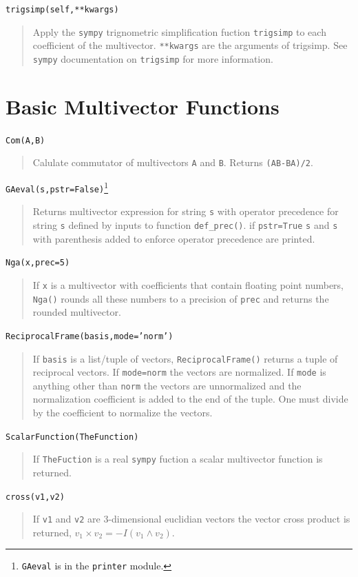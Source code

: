 \documentclass[12pt]{report}
\newcommand{\lp}{\left (}
\newcommand{\rp}{\right )}
\newcommand{\W}{\wedge}
\newcommand{\paren}[1]{\lp {#1} \rp}
\newcommand{\T}[1]{\texttt{#1}}
\begin{document}
\T{trigsimp(self,**kwargs)}
\begin{quote}
   Apply the \T{sympy} trignometric simplification fuction \T{trigsimp} to
   each coefficient of the multivector. \T{**kwargs} are the arguments of
   trigsimp.  See \T{sympy} documentation on \T{trigsimp} for more information.
\end{quote}

\section{Basic Multivector Functions}

\T{Com(A,B)}
\begin{quote}
   Calulate commutator of multivectors \T{A} and \T{B}.  Returns \T{(AB-BA)/2}.
\end{quote}
\T{GAeval(s,pstr=False)}\footnote{\T{GAeval} is in the \T{printer} module.\label{fn_6}}
\begin{quote}
   Returns multivector expression for string \T{s} with operator precedence for
   string \T{s} defined by inputs to function \T{def\_prec()}.  if \T{pstr=True}
   \T{s} and \T{s} with parenthesis added to enforce operator precedence are printed.
\end{quote}
\T{Nga(x,prec=5)}
\begin{quote}
   If \T{x} is a multivector with coefficients that contain floating point numbers, \T{Nga()}
   rounds all these numbers to a precision of \T{prec} and returns the rounded multivector.
\end{quote}
\T{ReciprocalFrame(basis,mode='norm')}
\begin{quote}
   If \T{basis} is a list/tuple of vectors, \T{ReciprocalFrame()} returns a tuple of reciprocal
   vectors.  If \T{mode=norm} the vectors are normalized.  If \T{mode} is anything other than
   \T{norm} the vectors are unnormalized and the normalization coefficient is added to the
   end of the tuple.  One must divide by the coefficient to normalize the vectors.
\end{quote}
\T{ScalarFunction(TheFunction)}
\begin{quote}
   If \T{TheFuction} is a real \T{sympy} fuction a scalar multivector function is returned.
\end{quote}
\T{cross(v1,v2)}
\begin{quote}
   If \T{v1} and \T{v2} are 3-dimensional euclidian vectors the vector cross product is
   returned, $v_{1}\times v_{2} = -I\paren{v_{1}\W v_{2}}$.
\end{quote}
\end{document}
